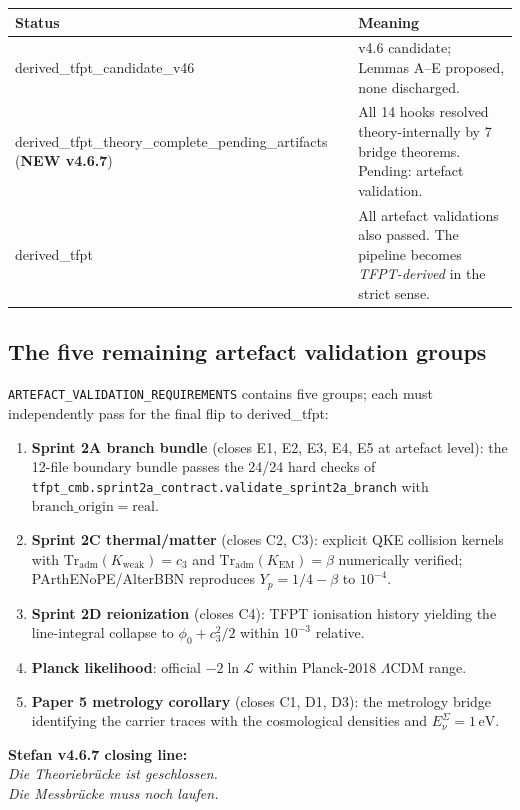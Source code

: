 \begin{center}
\renewcommand{\arraystretch}{1.18}
\begin{tabularx}{\textwidth}{@{}p{}Y@{}}
\toprule
\textbf{Status} & \textbf{Meaning} \\
\midrule
\textsf{derived\_tfpt\_candidate\_v46} &
v4.6 candidate; Lemmas A--E proposed, none discharged. \\
\textsf{derived\_tfpt\_theory\_complete\_\allowbreak{}pending\_artifacts}
\,(\textbf{NEW v4.6.7}) &
All 14 hooks resolved theory-internally by 7 bridge theorems.
Pending: artefact validation. \\
\textsf{derived\_tfpt} &
All artefact validations also passed. The pipeline becomes
\emph{TFPT-derived} in the strict sense. \\
\bottomrule
\end{tabularx}
\end{center}

\subsection{The five remaining artefact validation groups}

\texttt{ARTEFACT\_VALIDATION\_REQUIREMENTS} contains five groups; each
must independently pass for the final flip to \textsf{derived\_tfpt}:

\begin{enumerate}[leftmargin=1.4em]
\item \textbf{Sprint 2A branch bundle} (closes E1, E2, E3, E4, E5 at
artefact level): the 12-file boundary bundle passes the 24/24 hard
checks of \texttt{tfpt\_cmb.sprint2a\_contract.validate\_sprint2a\_branch}
with \(\mathrm{branch\_origin}=\mathrm{real}\).
\item \textbf{Sprint 2C thermal/matter} (closes C2, C3): explicit
QKE collision kernels with \(\mathrm{Tr}_{\mathrm{adm}}(K_{\mathrm{weak}})=c_3\)
and \(\mathrm{Tr}_{\mathrm{adm}}(K_{\mathrm{EM}})=\beta\) numerically
verified; PArthENoPE/AlterBBN reproduces \(Y_p=1/4-\beta\) to
\(10^{-4}\).
\item \textbf{Sprint 2D reionization} (closes C4): TFPT ionisation
history yielding the line-integral collapse to
\(\phi_0+c_3^2/2\) within \(10^{-3}\) relative.
\item \textbf{Planck likelihood}: official
\(-2\ln\mathcal L\) within Planck-2018 \(\Lambda\)CDM range.
\item \textbf{Paper 5 metrology corollary} (closes C1, D1, D3): the
metrology bridge identifying the carrier traces with the cosmological
densities and \(E_\nu^\Sigma=1\,\mathrm{eV}\).
\end{enumerate}

\begin{tfptfrontbox}
\textbf{Stefan v4.6.7 closing line:}\\
\emph{Die Theoriebrücke ist geschlossen.\\
Die Messbrücke muss noch laufen.}
\end{tfptfrontbox}

